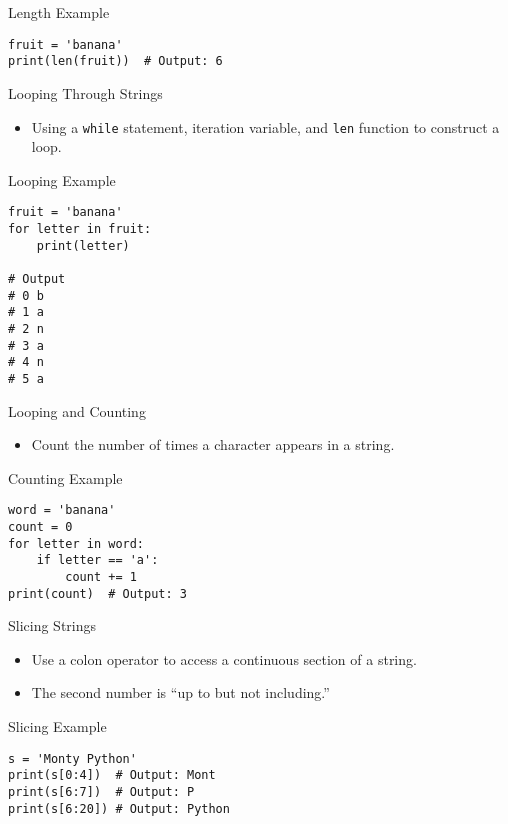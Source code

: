 \documentclass[serif, aspectratio=169]{beamer}
\begin{document}
\begin{frame}[fragile]{Length Example}
    \begin{lstlisting}
fruit = 'banana'
print(len(fruit))  # Output: 6
    \end{lstlisting}
\end{frame}

\begin{frame}{Looping Through Strings}
    \begin{itemize}
        \item Using a \texttt{while} statement, iteration variable, and \texttt{len} function to construct a loop.
    \end{itemize}
\end{frame}

\begin{frame}[fragile]{Looping Example}
    \begin{lstlisting}
fruit = 'banana'
for letter in fruit: 
    print(letter)
    
# Output
# 0 b
# 1 a
# 2 n
# 3 a
# 4 n
# 5 a
    \end{lstlisting}
\end{frame}

\begin{frame}{Looping and Counting}
    \begin{itemize}
        \item Count the number of times a character appears in a string.
    \end{itemize}
\end{frame}

\begin{frame}[fragile]{Counting Example}
    \begin{lstlisting}
word = 'banana'
count = 0
for letter in word:
    if letter == 'a':
        count += 1
print(count)  # Output: 3
    \end{lstlisting}
\end{frame}

\begin{frame}{Slicing Strings}
    \begin{itemize}
        \item Use a colon operator to access a continuous section of a string.
        \item The second number is “up to but not including.”
    \end{itemize}
\end{frame}

\begin{frame}[fragile]{Slicing Example}
    \begin{lstlisting}
s = 'Monty Python'
print(s[0:4])  # Output: Mont
print(s[6:7])  # Output: P
print(s[6:20]) # Output: Python
    \end{lstlisting}
\end{frame}
\end{document}
